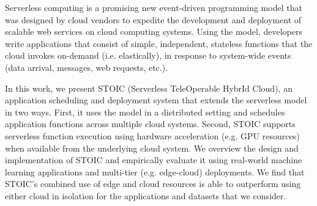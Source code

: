 Serverless computing is a promising new event-driven programming model that was designed by cloud vendors to expedite the development and deployment of scalable web services on cloud computing systems. Using the model, developers write applications that consist of simple, independent, stateless functions that the cloud invokes on-demand (i.e. elastically), in response to system-wide events (data arrival, messages, web requests, etc.).

In this work, we present STOIC (Serverless TeleOperable HybrId Cloud), an application scheduling and deployment system that extends the serverless model in two ways. First, it uses the model in a distributed setting and schedules application functions across multiple cloud systems. Second, STOIC supports serverless function execution using hardware acceleration (e.g. GPU resources) when available from the underlying cloud system. We overview the design and implementation of STOIC and empirically evaluate it using real-world machine learning applications and multi-tier (e.g. edge-cloud) deployments. We find that STOIC's combined use of edge and cloud resources is able to outperform using either cloud in isolation for the applications and datasets that we consider.


